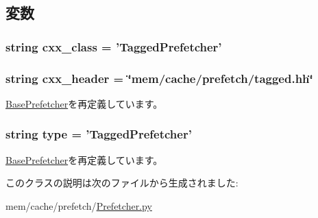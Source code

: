 \subsection{変数}
\hypertarget{classPrefetcher_1_1TaggedPrefetcher_a58cd55cd4023648e138237cfc0822ae3}{
\subsubsection[{cxx\_\-class}]{\setlength{\rightskip}{0pt plus 5cm}string cxx\_\-class = '{\bf TaggedPrefetcher}'}}
\label{classPrefetcher_1_1TaggedPrefetcher_a58cd55cd4023648e138237cfc0822ae3}
\hypertarget{classPrefetcher_1_1TaggedPrefetcher_a17da7064bc5c518791f0c891eff05fda}{
\subsubsection[{cxx\_\-header}]{\setlength{\rightskip}{0pt plus 5cm}string cxx\_\-header = \char`\"{}mem/cache/prefetch/tagged.hh\char`\"{}}}
\label{classPrefetcher_1_1TaggedPrefetcher_a17da7064bc5c518791f0c891eff05fda}


\hyperlink{classPrefetcher_1_1BasePrefetcher_a17da7064bc5c518791f0c891eff05fda}{BasePrefetcher}を再定義しています。\hypertarget{classPrefetcher_1_1TaggedPrefetcher_acce15679d830831b0bbe8ebc2a60b2ca}{
\subsubsection[{type}]{\setlength{\rightskip}{0pt plus 5cm}string type = '{\bf TaggedPrefetcher}'}}
\label{classPrefetcher_1_1TaggedPrefetcher_acce15679d830831b0bbe8ebc2a60b2ca}


\hyperlink{classPrefetcher_1_1BasePrefetcher_acce15679d830831b0bbe8ebc2a60b2ca}{BasePrefetcher}を再定義しています。

このクラスの説明は次のファイルから生成されました:\begin{DoxyCompactItemize}
\item 
mem/cache/prefetch/\hyperlink{Prefetcher_8py}{Prefetcher.py}\end{DoxyCompactItemize}
